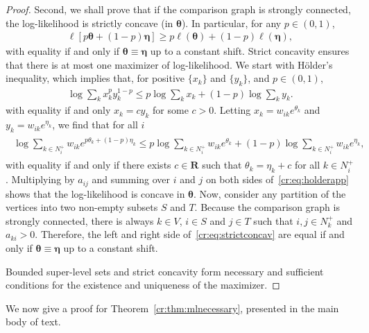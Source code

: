 \begin{proof}
Second, we shall prove that if the comparison graph is strongly connected, the log-likelihood is strictly concave (in $\bm{\theta}$).
In particular, for any $p \in (0,1)$,
\begin{align}
\label{cr:eq:strictconcav}
\ell \left[ p \bm{\theta} + (1-p) \bm{\eta} \right] \ge p \ell(\bm{\theta}) + (1-p) \ell(\bm{\eta}),
\end{align}
with equality if and only if $\bm{\theta} \equiv \bm{\eta}$ up to a constant shift.
Strict concavity ensures that there is at most one maximizer of log-likelihood.
We start with Hölder's inequality, which implies that, for positive $\{ x_k \}$ and $\{ y_k \}$, and $p \in (0,1)$,
\begin{align*}
\log \sum_k x_k^p y_k^{1-p} \le p \log \sum_k x_k + (1-p) \log \sum_k y_k.
\end{align*}
with equality if and only $x_k = c y_k$ for some $c > 0$.
Letting $x_k = w_{ik} e^{\theta_k}$ and $y_k = w_{ik} e^{\eta_k}$, we find that for all $i$
\begin{align}
\label{cr:eq:holderapp}
\begin{aligned}
\log \sum_{k \in N^+_i} w_{ik} e^{p \theta_k + (1-p) \eta_k}
    \le p \log\!\sum_{k \in N^+_i}\!w_{ik} e^{\theta_k} + (1-p) \log\!\sum_{k \in N^+_i}\!w_{ik} e^{\eta_k},
\end{aligned}
\end{align}
with equality if and only if there exists $c \in \mathbf{R}$ such that $\theta_k = \eta_k + c$ for all $k \in N^+_{i}$.
Multiplying by $a_{ij}$ and summing over $i$ and $j$ on both sides of~\eqref{cr:eq:holderapp} shows that the log-likelihood is concave in $\bm{\theta}$.
Now, consider any partition of the vertices into two non-empty subsets $S$ and $T$.
Because the comparison graph is strongly connected, there is always $k \in V$, $i \in S$ and $j \in T$ such that $i, j \in N^+_k$ and $a_{ki} > 0$.
Therefore, the left and right side of~\eqref{cr:eq:strictconcav} are equal if and only if $\bm{\theta} \equiv \bm{\eta}$ up to a constant shift.

Bounded super-level sets and strict concavity form necessary and sufficient conditions for the existence and uniqueness of the maximizer.
\end{proof}

We now give a proof for Theorem~\ref{cr:thm:mlnecessary}, presented in the main body of text.

